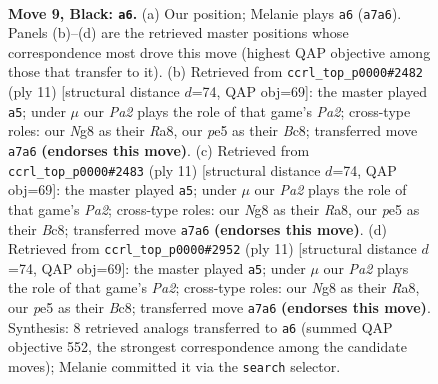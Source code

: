 \documentclass[11pt]{article}
\begin{document}
\clearpage

\begin{figure}[p]\centering
\begin{subfigure}{0.46\textwidth}\centering
\resizebox{\linewidth}{!}{%
\newchessgame
\chessboard[
  setfen={rn2kbnr/pp3ppp/1q2p3/2ppP2b/2PP3P/1P2BN2/P3BPP1/RN1QK2R b KQkq - 0 9},
  showmover=false,
  pgfstyle=straightmove, color=movearrow, markmove={a7-a6}
]}
\caption{}
\end{subfigure}\hfill
\begin{subfigure}{0.46\textwidth}\centering
\resizebox{\linewidth}{!}{%
\newchessgame
\chessboard[
  setfen={r1b1kbnr/pp3ppp/1qn1p3/2ppP3/3P4/P1P2N2/1P3PPP/RNBQKB1R b KQkq - 0 6},
  showmover=false,
  pgfstyle=straightmove, color=movearrow, markmove={a7-a5}
]}
\caption{}
\end{subfigure}
\\[4pt]
\begin{subfigure}{0.46\textwidth}\centering
\resizebox{\linewidth}{!}{%
\newchessgame
\chessboard[
  setfen={r1b1kbnr/pp3ppp/1qn1p3/2ppP3/3P4/P1P2N2/1P3PPP/RNBQKB1R b KQkq - 0 6},
  showmover=false,
  pgfstyle=straightmove, color=movearrow, markmove={a7-a5}
]}
\caption{}
\end{subfigure}\hfill
\begin{subfigure}{0.46\textwidth}\centering
\resizebox{\linewidth}{!}{%
\newchessgame
\chessboard[
  setfen={r1b1kbnr/pp3ppp/1qn1p3/2ppP3/3P4/P1P2N2/1P3PPP/RNBQKB1R b KQkq - 0 6},
  showmover=false,
  pgfstyle=straightmove, color=movearrow, markmove={a7-a5}
]}
\caption{}
\end{subfigure}
\caption{\textbf{Move 9, Black: \texttt{a6}.} (a) Our position; Melanie plays \texttt{a6} (\texttt{a7a6}). Panels (b)--(d) are the retrieved master positions whose correspondence most drove this move (highest QAP objective among those that transfer to it). (b) Retrieved from \texttt{ccrl\_top\_p0000\#2482} (ply 11) [structural distance $d$=74, QAP obj=69]: the master played \texttt{a5}; under $\mu$ our \emph{Pa2} plays the role of that game's \emph{Pa2}; cross-type roles: our \emph{N}g8 as their \emph{R}a8, our \emph{p}e5 as their \emph{B}c8; transferred move \texttt{a7a6} \textbf{(endorses this move)}. (c) Retrieved from \texttt{ccrl\_top\_p0000\#2483} (ply 11) [structural distance $d$=74, QAP obj=69]: the master played \texttt{a5}; under $\mu$ our \emph{Pa2} plays the role of that game's \emph{Pa2}; cross-type roles: our \emph{N}g8 as their \emph{R}a8, our \emph{p}e5 as their \emph{B}c8; transferred move \texttt{a7a6} \textbf{(endorses this move)}. (d) Retrieved from \texttt{ccrl\_top\_p0000\#2952} (ply 11) [structural distance $d$=74, QAP obj=69]: the master played \texttt{a5}; under $\mu$ our \emph{Pa2} plays the role of that game's \emph{Pa2}; cross-type roles: our \emph{N}g8 as their \emph{R}a8, our \emph{p}e5 as their \emph{B}c8; transferred move \texttt{a7a6} \textbf{(endorses this move)}. Synthesis: 8 retrieved analogs transferred to \texttt{a6} (summed QAP objective 552, the strongest correspondence among the candidate moves); Melanie committed it via the \texttt{search} selector.}
\label{fig:thought-m17}
\end{figure}
\end{document}
